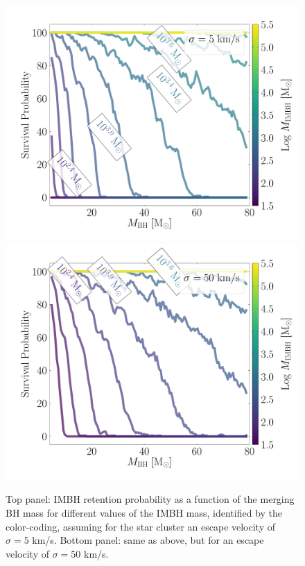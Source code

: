 \documentclass[article]{aa}
\begin{document}
\begin{figure}
\centering
\includegraphics[width=\columnwidth]{survival}
\includegraphics[width=\columnwidth]{survival50}
\caption{Top panel: IMBH retention probability as a function of the merging BH mass for different values of the IMBH mass, identified by the color-coding, assuming for the star cluster an escape velocity of $\sigma = 5$ km/s. Bottom panel: same as above, but for an escape velocity of $\sigma = 50$ km/s.}
\label{fig:survival}
\end{figure}
\end{document}
